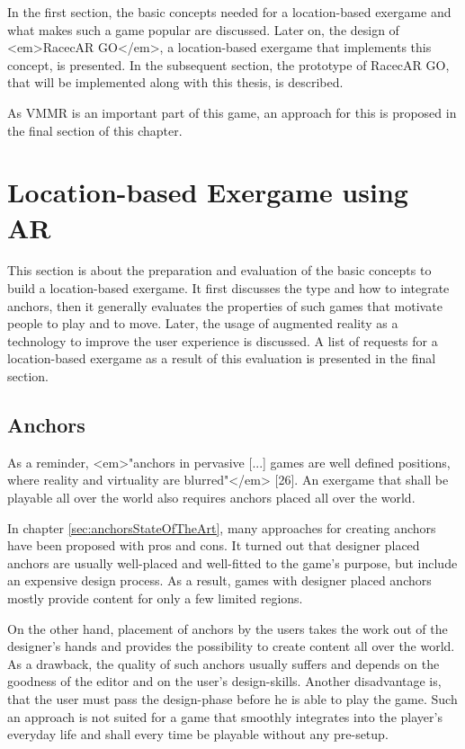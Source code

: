 In the first section, the basic concepts needed for a location-based exergame and what makes such a game popular are discussed. Later on, the design of <em>RacecAR GO</em>, a location-based exergame that implements this concept, is presented. In the subsequent section, the prototype of RacecAR GO, that will be implemented along with this thesis, is described.

As VMMR is an important part of this game, an approach for this is proposed in the final section of this chapter.


\section{Location-based Exergame using AR}
This section is about the preparation and evaluation of the basic concepts to build a location-based exergame. It first discusses the type and how to integrate anchors, then it generally evaluates the properties of such games that motivate people to play and to move. Later, the usage of augmented reality as a technology to improve the user experience is discussed. A list of requests for a location-based exergame as a result of this evaluation is presented in the final section.

\subsection{Anchors}\label{sec:anchorsConcept}
As a reminder, <em>"anchors in pervasive [...] games are well defined positions, where reality and virtuality are blurred"</em> [26]. An exergame that shall be playable all over the world also requires anchors placed all over the world.

In chapter \ref{sec:anchorsStateOfTheArt}, many approaches for creating anchors have been proposed with pros and cons. It turned out that designer placed anchors are usually well-placed and well-fitted to the game’s purpose, but include an expensive design process. As a result, games with designer placed anchors mostly provide content for only a few limited regions.

On the other hand, placement of anchors by the users takes the work out of the designer’s hands and provides the possibility to create content all over the world. As a drawback, the quality of such anchors usually suffers and depends on the goodness of the editor and on the user's design-skills. Another disadvantage is, that the user must pass the design-phase before he is able to play the game. Such an approach is not suited for a game that smoothly integrates into the player’s everyday life and shall every time be playable without any pre-setup.

